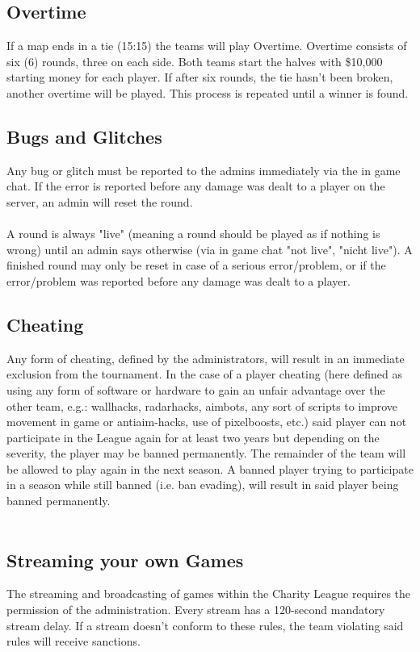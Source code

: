 \documentclass{article}
\begin{document}
\subsection{Overtime}
If a map ends in a tie (15:15) the teams will play Overtime. Overtime consists of six (6) rounds, three on each side. Both teams start the
halves with \$10,000 starting money for each player. If after six rounds, the tie hasn't been broken, another overtime will be played. This process is repeated until a winner is found. 


\subsection{Bugs and Glitches}
Any bug or glitch must be reported to the admins immediately via the in game chat. If the error is reported before any damage was dealt to a player on the server, an admin will reset the round. \\
\\
A round is always "live" (meaning a round should be played as if nothing is wrong) until an admin says otherwise (via in game chat "not 
live", "nicht live"). A finished round may only be reset in case of a serious error/problem, or if the error/problem was reported before
any damage was dealt to a player. 




\subsection{Cheating}
Any form of cheating, defined by the administrators, will result in an immediate exclusion from the tournament. In the case of a player 
cheating (here defined as using any form of software or hardware to gain an unfair advantage over the other team, e.g.: wallhacks, 
radarhacks, aimbots, any sort of scripts to improve movement in game or antiaim-hacks, use of pixelboosts,  etc.) said player can not 
participate in the League again for at least two years but depending on the severity, the player may be banned permanently. The remainder
of the team will be allowed to play again in the 
next season. A banned player trying to participate in a season while still banned (i.e. ban evading), will result in said player being
banned permanently.\\
\\




\subsection{Streaming your own Games}
The streaming and broadcasting of games within the Charity League requires the permission of the
administration. Every stream has a 120-second mandatory stream delay. If a stream doesn't conform to 
these rules, the team violating said rules will receive sanctions.
\end{document}
